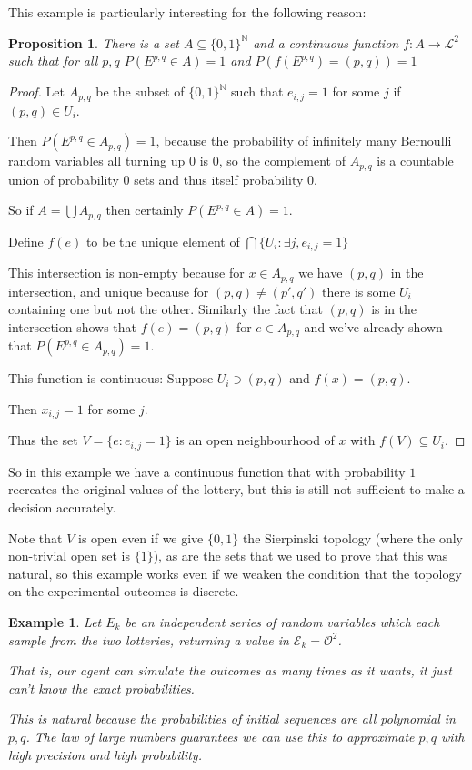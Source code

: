 \documentclass[a4paper]{book}
\newtheorem{proposition}{Proposition}
\newtheorem{example}{Example}
\begin{document}
This example is particularly interesting for the following reason:

\begin{proposition}
There is a set $A \subseteq \{0, 1\}^{\mathbb{N}}$
and a continuous function $f: A \to \mathcal{L}^2$
such that for all $p, q$
$P(E^{p, q} \in A) = 1$
and $P(f(E^{p, q}) = (p, q)) = 1$
\end{proposition}

\begin{proof}
Let $A_{p, q}$
be the subset of $\{0, 1\}^{\mathbb{N}}$
such that $e_{i, j} = 1$
for some $j$
if $(p, q) \in U_i$.

Then $P(E^{p, q} \in A_{p, q}) = 1$,
because the probability of infinitely many Bernoulli random variables all
turning up $0$
is $0$,
so the complement of $A_{p, q}$
is a countable union of probability $0$
sets and thus itself probability $0$.

So if $A = \bigcup A_{p, q}$
then certainly $P(E^{p, q} \in A) = 1$.

Define $f(e)$
to be the unique element of $\bigcap \{U_i: \exists j, e_{i, j} = 1\}$

This intersection is non-empty because for \(x \in A_{p, q}\)
we have $(p, q)$
in the intersection, and unique because for $(p, q) \neq (p', q')$
there is some $U_i$
containing one but not the other. Similarly the fact that $(p, q)$
is in the intersection shows that $f(e) = (p, q)$
for $e \in A_{p, q}$
and we've already shown that $P(E^{p, q} \in A_{p, q}) = 1$.

This function  is continuous: Suppose $U_i \ni (p, q)$
and $f(x) = (p, q)$.

Then $x_{i, j} = 1$
for some $j$.

Thus the set $V = \{e: e_{i, j} = 1\}$
is an open neighbourhood of $x$
with $f(V) \subseteq U_i$.
\end{proof}

So in this example we have a continuous function that with probability $1$
recreates the original values of the lottery, but this is still not
sufficient to make a decision accurately.

Note that $V$ is open even if we give $\{0, 1\}$
the Sierpinski topology (where the only non-trivial open set
is $\{1\}$),
as are the sets that we used to prove that this was natural,
so this example works even if we weaken the condition that
the topology on the experimental outcomes is discrete.

\begin{example}
Let $E_k$ be an independent series of random variables which each sample from the two
lotteries, returning a value in $\mathcal{E}_k = \mathcal{O}^2$.

That is, our agent can simulate
the outcomes as many times as it wants, it just can't know the exact probabilities.

This is natural because the probabilities of initial sequences are all
polynomial in $p, q$.
The law of large numbers guarantees we can use this to approximate $p, q$
with high precision and high probability.
\end{example}
\end{document}
